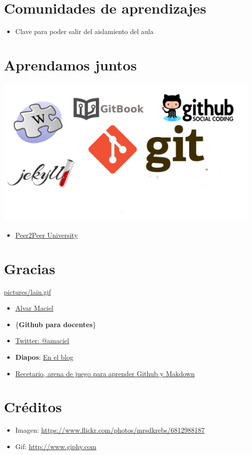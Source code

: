 \documentclass[11pt]{article}
\begin{document}
\section{Comunidades de aprendizajes}
\label{sec:orgheadline12}
\begin{itemize}
\item Clave para poder salir del aislamiento del aula
\end{itemize}
\section{Aprendamos juntos}
\label{sec:orgheadline13}
\includegraphics[width=.9\linewidth]{pictures/PortadaBlancoLogos2.png}
\begin{itemize}
\item \href{http://p2pu.org}{Peer2Peer University}
\end{itemize}
\section{Gracias}
\label{sec:orgheadline14}
\url{pictures/lain.gif}

\begin{itemize}
\item \href{http://acercadelaeducacion.com.ar}{Alvar Maciel}
\item \{\textbf{Github para docentes}\}
\item \href{https:/twitter.com/amaciel}{Twitter: @amaciel}
\item \textbf{Diapos}: \href{http://www.acercadelaeducacion.com.ar/2014/11/charla-herramintas-distriibuidas-para-planificar/}{En el blog}
\item \href{https://github.com/acercadelaeducacion/recetario/fork}{Recetario, arena de juego para aprender Github y Makdown}
\end{itemize}
\section{Créditos}
\label{sec:orgheadline15}
\begin{itemize}
\item Imagen: \url{https://www.flickr.com/photos/mrsdkrebs/6812988187}
\item Gif: \url{http://www.giphy.com}
\end{itemize}
\end{document}
